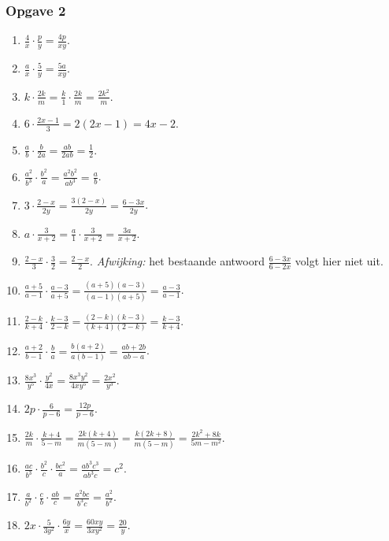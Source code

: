 \subsubsection*{Opgave 2}
\begin{enumerate}[label=\alph*)]
\item $\frac{4}{x}\cdot\frac{p}{y}=\frac{4p}{xy}$.
\item $\frac{a}{x}\cdot\frac{5}{y}=\frac{5a}{xy}$.
\item $k\cdot\frac{2k}{m}=\frac{k}{1}\cdot\frac{2k}{m}=\frac{2k^2}{m}$.
\item $6\cdot\frac{2x-1}{3}=2(2x-1)=4x-2$.
\item $\frac{a}{b}\cdot\frac{b}{2a}=\frac{ab}{2ab}=\frac{1}{2}$.
\item $\frac{a^2}{b^3}\cdot\frac{b^2}{a}=\frac{a^2b^2}{ab^3}=\frac{a}{b}$.
\item $3\cdot\frac{2-x}{2y}=\frac{3(2-x)}{2y}=\frac{6-3x}{2y}$.
\item $a\cdot\frac{3}{x+2}=\frac{a}{1}\cdot\frac{3}{x+2}=\frac{3a}{x+2}$.
\item $\frac{2-x}{3}\cdot\frac{3}{2}=\frac{2-x}{2}$. \emph{Afwijking:} het bestaande antwoord $\frac{6-3x}{6-2x}$ volgt hier niet uit.
\item $\frac{a+5}{a-1}\cdot\frac{a-3}{a+5}=\frac{(a+5)(a-3)}{(a-1)(a+5)}=\frac{a-3}{a-1}$.
\item $\frac{2-k}{k+4}\cdot\frac{k-3}{2-k}=\frac{(2-k)(k-3)}{(k+4)(2-k)}=\frac{k-3}{k+4}$.
\item $\frac{a+2}{b-1}\cdot\frac{b}{a}=\frac{b(a+2)}{a(b-1)}=\frac{ab+2b}{ab-a}$.
\item $\frac{8x^3}{y^5}\cdot\frac{y^2}{4x}=\frac{8x^3y^2}{4xy^5}=\frac{2x^2}{y^3}$.
\item $2p\cdot\frac{6}{p-6}=\frac{12p}{p-6}$.
\item $\frac{2k}{m}\cdot\frac{k+4}{5-m}=\frac{2k(k+4)}{m(5-m)}=\frac{k(2k+8)}{m(5-m)}=\frac{2k^2+8k}{5m-m^2}$.
\item $\frac{ac}{b^3}\cdot\frac{b^2}{c}\cdot\frac{bc^2}{a}=\frac{ab^3c^3}{ab^3c}=c^2$.
\item $\frac{a}{b^2}\cdot\frac{c}{b}\cdot\frac{ab}{c}=\frac{a^2bc}{b^3c}=\frac{a^2}{b^2}$.
\item $2x\cdot\frac{5}{3y^2}\cdot\frac{6y}{x}=\frac{60xy}{3xy^2}=\frac{20}{y}$.
\end{enumerate}

